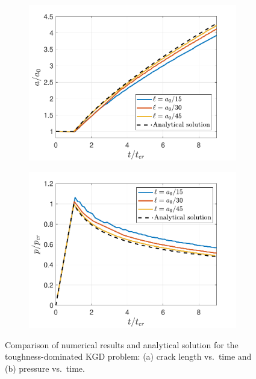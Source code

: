 \begin{figure}
\centering
\begin{subfigure}{.5\textwidth}
  \centering
  \includegraphics[width=.99\linewidth]{img/toughness_prob/length_tkgd}
  \caption{}
  \label{fig:tkgd_length}
\end{subfigure}%
\begin{subfigure}{.5\textwidth}
  \centering
  \includegraphics[width=.99\linewidth]{img/toughness_prob/pressure_tkgd}
  \caption{}
  \label{fig:tkgd_pressure}
\end{subfigure}
\caption{Comparison of numerical results and analytical solution for the toughness-dominated KGD problem: (a) crack length vs.\ time and (b) pressure vs.\ time.}
  \label{fig:tkgd_charts}
\end{figure}
\FloatBarrier

